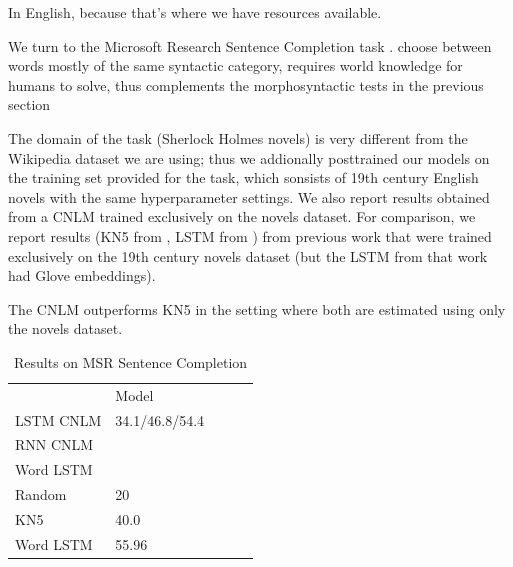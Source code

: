 In English, because that's where we have resources available.



We turn to the Microsoft Research Sentence Completion task \cite{Zweig:Burges:2011}.
choose between words mostly of the same syntactic category, requires world knowledge for humans to solve, thus complements the morphosyntactic tests in the previous section

The domain of the task (Sherlock Holmes novels) is very different from the Wikipedia dataset we are using; thus we addionally posttrained our models on the training set provided for the task, which sonsists of 19th century English novels with the same hyperparameter settings.
We also report results obtained from a CNLM trained exclusively on the novels dataset.
For comparison, we report results (KN5 from \cite{Mikolov:2012}, LSTM from \cite{zhang2016top}) from previous work that were trained exclusively on the 19th century novels dataset (but the LSTM from that work had Glove embeddings). %


The CNLM outperforms KN5 in the setting where both are estimated using only the novels dataset.

\begin{table}[t]
  \begin{center}
    \begin{tabular}{l|l|l|l|l}
      \multicolumn{1}{c}{}& Model \\
LSTM CNLM	    &      34.1/46.8/54.4 \\
	    RNN CNLM & \\
	    Word LSTM \\ \hline
	    Random & 20 \\
	    KN5   & 40.0 \\
	    Word LSTM & 55.96 \\
    \end{tabular}
  \end{center}
  \caption{\label{tab:msr-completion-results} Results on MSR Sentence Completion}
\end{table}




